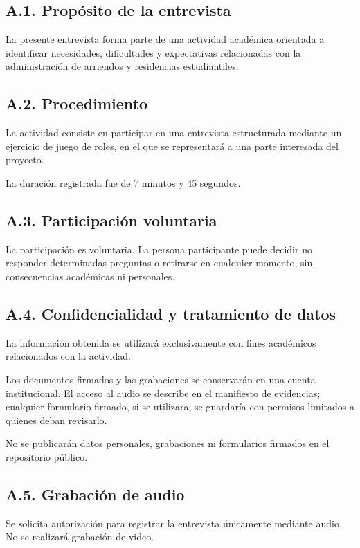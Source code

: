 \documentclass[12pt,a4paper]{article}
\begin{document}
\subsection*{A.1. Propósito de la entrevista}

La presente entrevista forma parte de una actividad académica
orientada a identificar necesidades, dificultades y expectativas
relacionadas con la administración de arriendos y residencias
estudiantiles.

\subsection*{A.2. Procedimiento}

La actividad consiste en participar en una entrevista estructurada
mediante un ejercicio de juego de roles, en el que se representará
a una parte interesada del proyecto.

La duración registrada fue de 7 minutos y 45 segundos.

\subsection*{A.3. Participación voluntaria}

La participación es voluntaria. La persona participante puede
decidir no responder determinadas preguntas o retirarse en
cualquier momento, sin consecuencias académicas ni personales.

\subsection*{A.4. Confidencialidad y tratamiento de datos}

La información obtenida se utilizará exclusivamente con fines
académicos relacionados con la actividad.

Los documentos firmados y las grabaciones se conservarán
en una cuenta institucional. El acceso al audio se describe en el manifiesto de evidencias; cualquier formulario firmado, si se utilizara, se guardaría con permisos limitados a quienes deban revisarlo.

No se publicarán datos personales, grabaciones ni formularios
firmados en el repositorio público.

\subsection*{A.5. Grabación de audio}

Se solicita autorización para registrar la entrevista
únicamente mediante audio. No se realizará grabación de video.
\end{document}
